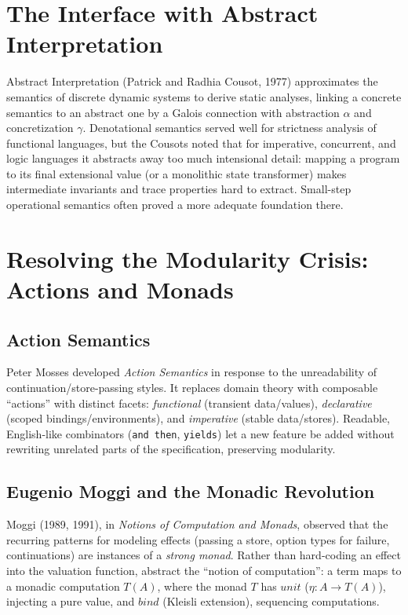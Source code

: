 \documentclass[11pt]{article}
\begin{document}
\section{The Interface with Abstract Interpretation}

Abstract Interpretation (Patrick and Radhia Cousot, 1977) approximates the semantics of
discrete dynamic systems to derive static analyses, linking a concrete semantics to an
abstract one by a Galois connection with abstraction $\alpha$ and concretization $\gamma$.
Denotational semantics served well for strictness analysis of functional languages, but the
Cousots noted that for imperative, concurrent, and logic languages it abstracts away too
much intensional detail: mapping a program to its final extensional value (or a monolithic
state transformer) makes intermediate invariants and trace properties hard to extract. Small-step
operational semantics often proved a more adequate foundation there.

\section{Resolving the Modularity Crisis: Actions and Monads}

\subsection{Action Semantics}

Peter Mosses developed \emph{Action Semantics} in response to the unreadability of
continuation/store-passing styles. It replaces domain theory with composable ``actions''
with distinct facets: \emph{functional} (transient data/values), \emph{declarative} (scoped
bindings/environments), and \emph{imperative} (stable data/stores). Readable, English-like
combinators (\texttt{and then}, \texttt{yields}) let a new feature be added without rewriting
unrelated parts of the specification, preserving modularity.

\subsection{Eugenio Moggi and the Monadic Revolution}

Moggi (1989, 1991), in \emph{Notions of Computation and Monads}, observed that the recurring
patterns for modeling effects (passing a store, option types for failure, continuations) are
instances of a \emph{strong monad}. Rather than hard-coding an effect into the valuation
function, abstract the ``notion of computation'': a term maps to a monadic computation
$T(A)$, where the monad $T$ has $\mathit{unit}$ ($\eta : A \to T(A)$), injecting a pure value,
and $\mathit{bind}$ (Kleisli extension), sequencing computations.
\end{document}
